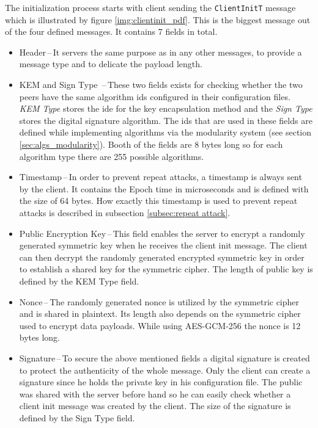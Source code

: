 The initialization process starts with client sending the \texttt{ClientInitT} message which is illustrated by figure \ref{img:clientinit_pdf}. This is the biggest message out of the four defined messages. It contains 7 fields in total.
\begin{itemize}
  \item Header\,--\,It servers the same purpose as in any other messages, to provide a message type and to delicate the payload length.
  \item KEM and Sign Type \,--\,These two fields exists for checking whether the two peers have the same algorithm ids configured in their configuration files. \textit{KEM Type} stores the ide for the key encapsulation method and the \textit{Sign Type} stores the digital signature algorithm. The ids that are used in these fields are defined while implementing algorithms via the modularity system (see section \ref{sec:algs_modularity}). Booth of the fields are 8 bytes long so for each algorithm type there are 255 possible algorithms.
  \item Timestamp\,--\,In order to prevent repeat attacks, a timestamp is always sent by the client. It contains the Epoch time in microseconds and is defined with the size of 64 bytes. How exactly this timestamp is used to prevent repeat attacks is described in subsection \ref{subsec:repeat attack}.
  \item Public Encryption Key\,--\,This field enables the server to encrypt a randomly generated symmetric key when he receives the client init message. The client can then decrypt the randomly generated encrypted symmetric key in order to establish a shared key for the symmetric cipher. The length of public key is defined by the KEM Type field.
  \item Nonce\,--\,The randomly generated nonce is utilized by the symmetric cipher and is shared in plaintext. Its length also depends on the symmetric cipher used to encrypt data payloads. While using AES-GCM-256 the nonce is 12 bytes long.
  \item Signature\,--\,To secure the above mentioned fields a digital signature is created to protect the authenticity of the whole message. Only the client can create a signature since he holds the private key in his configuration file. The public was shared with the server before hand so he can easily check whether a client init message was created by the client. The size of the signature is defined by the Sign Type field.
\end{itemize}

